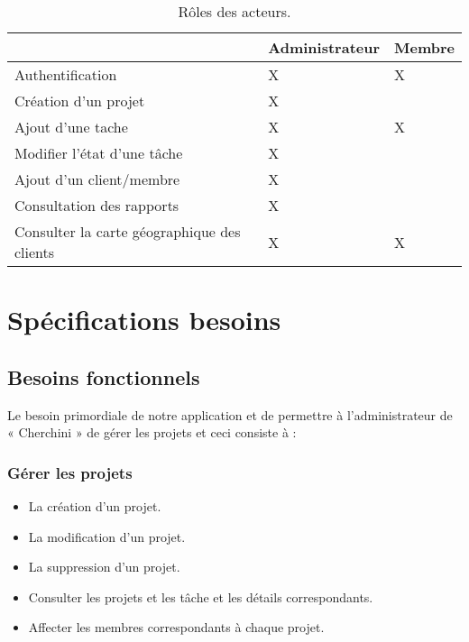 \FloatBarrier
\begin{table}[H]
\centering
\begin{tabular}{|l|l|l|}
\hline
                                            & Administrateur & Membre  \\
\hline
Authentification~                           & X              & X       \\
\hline
Création d’un projet                        & X              &         \\
\hline
Ajout d’une tache                           & X              & X       \\
\hline
Modifier l’état d’une tâche                 & X              &         \\
\hline
Ajout d’un client/membre                    & X              &         \\
\hline
Consultation des rapports                   & X              &         \\
\hline
Consulter la carte géographique des clients & X              & X       \\
\hline
\end{tabular}
\centering
\caption{Rôles  des acteurs.}
\end{table}
\FloatBarrier


\section{ Sp\'{e}cifications besoins}

  \subsection{Besoins fonctionnels}

Le besoin primordiale de notre application et de permettre à l’administrateur
de « Cherchini » de gérer les projets et ceci consiste à :

\subsubsection{G\'{e}rer les projets}

\begin{itemize}
\item{La cr\'{e}ation d’un projet.}
\item{La modification d'un projet.}
\item{La suppression d'un projet.}
\item{Consulter les projets et les t\^{a}che et les d\'{e}tails correspondants.}
\item{Affecter les membres correspondants \`{a} chaque projet.}
\end{itemize}

